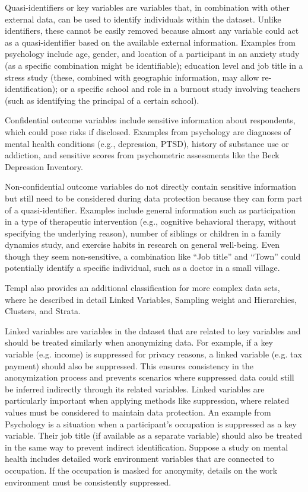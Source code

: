 \documentclass{article}
\begin{document}
Quasi-identifiers or key variables are variables that, in combination with other external data, can be used to identify individuals within the dataset. Unlike identifiers, these cannot be easily removed because almost any variable could act as a quasi-identifier based on the available external information. Examples from psychology include age, gender, and location of a participant in an anxiety study (as a specific combination might be identifiable); education level and job title in a stress study (these, combined with geographic information, may allow re-identification); or a specific school and role in a burnout study involving teachers (such as identifying the principal of a certain school).

Confidential outcome variables include sensitive information about respondents, which could pose risks if disclosed. Examples from psychology are diagnoses of mental health conditions (e.g., depression, PTSD), history of substance use or addiction, and sensitive scores from psychometric assessments like the Beck Depression Inventory.

Non-confidential outcome variables do not directly contain sensitive information but still need to be considered during data protection because they can form part of a quasi-identifier. Examples include general information such as participation in a type of therapeutic intervention (e.g., cognitive behavioral therapy, without specifying the underlying reason), number of siblings or children in a family dynamics study, and exercise habits in research on general well-being. Even though they seem non-sensitive, a combination like “Job title” and “Town” could potentially identify a specific individual, such as a doctor in a small village.
\newline

Templ \cite{2017_Templ} also provides an additional classification for more complex data sets, where he described in detail Linked Variables, Sampling weight and Hierarchies, Clusters, and Strata.

Linked variables are variables in the dataset that are related to key variables and should be treated similarly when anonymizing data. For example, if a key variable (e.g. income) is suppressed for privacy reasons, a linked variable (e.g. tax payment) should also be suppressed. This ensures consistency in the anonymization process and prevents scenarios where suppressed data could still be inferred indirectly through its related variables. Linked variables are particularly important when applying methods like suppression, where related values must be considered to maintain data protection. 
An example from Psychology is a situation when a participant's occupation is suppressed as a key variable. Their job title (if available as a separate variable) should also be treated in the same way to prevent indirect identification.
Suppose a study on mental health includes detailed work environment variables that are connected to occupation. If the occupation is masked for anonymity, details on the work environment must be consistently suppressed.
\end{document}
